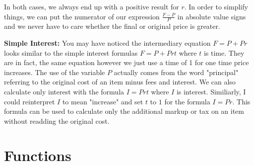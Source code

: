 \documentclass{article}
\begin{document}
\bigskip

In both cases, we always end up with a positive result for $r$. In order to simplify things, we can put the numerator of our expression $\frac{F-P}{P}$ in absolute value signs and we never have to care whether the final or original price is greater.

\textbf{Simple Interest: } You may have noticed the intermediary equation $F=P+Pr$ looks similar to the simple interest formulas $F=P+Prt$ where $t$ is time. They are in fact, the same equation however we just use a time of 1 for one time price increases. The use of the variable $P$ actually comes from the word "principal" referring to the original cost of an item minus fees and interest.
\bigskip
\indent We can also calculate only interest with the formula $I=Prt$ where $I$ is interest. Similiarly, I could reinterpret $I$ to mean "increase" and set $t$ to $1$ for the formula $I=Pr$. This formula can be used to calculate only the additional markup or tax on an item without readding the original cost.

\section{Functions}
\end{document}
